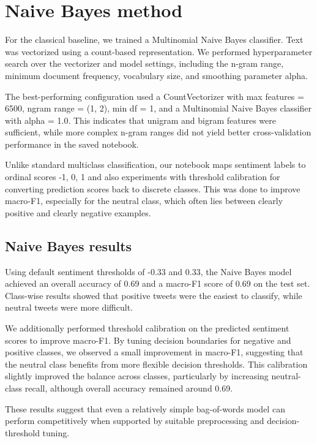 \documentclass[11pt]{article}
\begin{document}
\section{Naive Bayes method}

For the classical baseline, we trained a Multinomial Naive Bayes classifier. Text was vectorized using a count-based representation. We performed hyperparameter search over the vectorizer and model settings, including the n-gram range, minimum document frequency, vocabulary size, and smoothing parameter alpha.

The best-performing configuration used a CountVectorizer with max features = 6500, ngram range = (1, 2), min df = 1, and a Multinomial Naive Bayes classifier with alpha = 1.0. This indicates that unigram and bigram features were sufficient, while more complex n-gram ranges did not yield better cross-validation performance in the saved notebook.

Unlike standard multiclass classification, our notebook maps sentiment labels to ordinal scores {-1, 0, 1} and also experiments with threshold calibration for converting prediction scores back to discrete classes. This was done to improve macro-F1, especially for the neutral class, which often lies between clearly positive and clearly negative examples.

\subsection{Naive Bayes results}

Using default sentiment thresholds of -0.33 and 0.33, the Naive Bayes model achieved an overall accuracy of 0.69 and a macro-F1 score of 0.69 on the test set. Class-wise results showed that positive tweets were the easiest to classify, while neutral tweets were more difficult.

We additionally performed threshold calibration on the predicted sentiment scores to improve macro-F1. By tuning decision boundaries for negative and positive classes, we observed a small improvement in macro-F1, suggesting that the neutral class benefits from more flexible decision thresholds. This calibration slightly improved the balance across classes, particularly by increasing neutral-class recall, although overall accuracy remained around 0.69.

These results suggest that even a relatively simple bag-of-words model can perform competitively when supported by suitable preprocessing and decision-threshold tuning.
\end{document}
